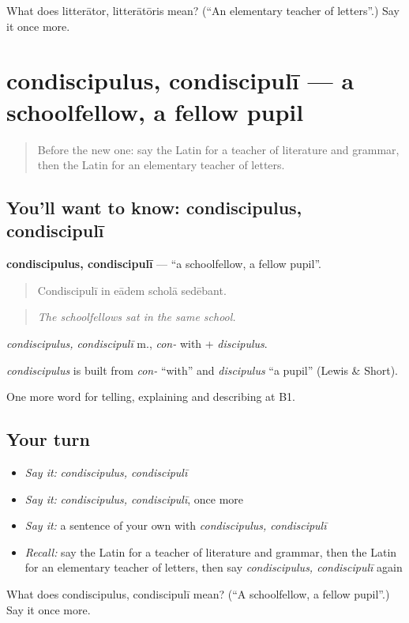 \begin{tcolorbox}[breakable,colback=teal!4,colframe=teal!35!black,title={Before you move on}]
What does litterātor, litterātōris mean? (\textquotedblleft{}An elementary teacher of letters\textquotedblright{}.) Say it once more.
\end{tcolorbox}
\section[condiscipulus, condiscipulī]{condiscipulus, condiscipulī — a schoolfellow, a fellow pupil}

\label{lesson:LA-C401-condiscipulus}



\begin{quote}
Before the new one: say the Latin for a teacher of literature and grammar, then the Latin for an elementary teacher of letters.
\end{quote}

\subsection*{You'll want to know: condiscipulus, condiscipulī}
\textbf{condiscipulus, condiscipulī} — \textquotedblleft{}a schoolfellow, a fellow pupil\textquotedblright{}.

\begin{quote}
Condiscipulī in eādem scholā sedēbant.
\end{quote}

\begin{quote}
\emph{The schoolfellows sat in the same school.}
\end{quote}

\emph{condiscipulus, condiscipulī} m., \emph{con-} with + \emph{discipulus}.

\begin{cousinweb}
\emph{condiscipulus} is built from \emph{con-} \textquotedblleft{}with\textquotedblright{} and \emph{discipulus} \textquotedblleft{}a pupil\textquotedblright{} (Lewis \& Short).
\end{cousinweb}

\begin{grammarlens}[title={What you've built}]
One more word for telling, explaining and describing at B1.
\end{grammarlens}

\subsection*{Your turn}
\begin{itemize}
\raggedright
  \item \emph{Say it:} \emph{condiscipulus, condiscipulī}
  \item \emph{Say it:} \emph{condiscipulus, condiscipulī}, once more
  \item \emph{Say it:} a sentence of your own with \emph{condiscipulus, condiscipulī}
  \item \emph{Recall:} say the Latin for a teacher of literature and grammar, then the Latin for an elementary teacher of letters, then say \emph{condiscipulus, condiscipulī} again
\end{itemize}

\begin{tcolorbox}[breakable,colback=teal!4,colframe=teal!35!black,title={Before you move on}]
What does condiscipulus, condiscipulī mean? (\textquotedblleft{}A schoolfellow, a fellow pupil\textquotedblright{}.) Say it once more.
\end{tcolorbox}
